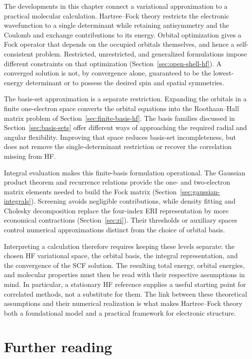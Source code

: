 \documentclass[11pt,a4paper,titlepage]{article}
\numberwithin{equation}{section}
\begin{document}
The developments in this chapter connect a variational approximation to a
practical molecular calculation. Hartree--Fock theory restricts the
electronic wavefunction to a single determinant while retaining
antisymmetry and the Coulomb and exchange contributions to its energy.
Orbital optimization gives a Fock operator that depends on the occupied
orbitals themselves, and hence a self-consistent problem. Restricted,
unrestricted, and generalized formulations impose different constraints on
that optimization (Section~\ref{sec:open-shell-hf}). A converged solution is
not, by convergence alone, guaranteed to be the lowest-energy determinant
or to possess the desired spin and spatial symmetries.

The basis-set approximation is a separate restriction. Expanding the
orbitals in a finite one-electron space converts the orbital equations into
the Roothaan--Hall matrix problem of Section~\ref{sec:finite-basis-hf}.
The basis families discussed in Section~\ref{sec:basis-sets} offer different
ways of approaching the required radial and angular flexibility. Improving
that space reduces basis-set incompleteness, but does not remove the
single-determinant restriction or recover the correlation missing from HF.

Integral evaluation makes this finite-basis formulation operational. The
Gaussian product theorem and recurrence relations provide the one- and
two-electron matrix elements needed to build the Fock matrix
(Section~\ref{sec:gaussian-integrals}). Screening avoids negligible
contributions, while density fitting and Cholesky decomposition replace the
four-index ERI representation by more economical contractions
(Section~\ref{sec:ri}). Their thresholds or auxiliary spaces control
numerical approximations distinct from the choice of orbital basis.

Interpreting a calculation therefore requires keeping these levels
separate: the chosen HF variational space, the orbital basis, the integral
representation, and the convergence of the SCF solution. The resulting
total energy, orbital energies, and molecular properties must then be read
with their respective assumptions in mind. In particular, a stationary HF
reference supplies a useful starting point for correlated methods, not a
substitute for them. The link between these theoretical assumptions and
their numerical realization is what makes Hartree--Fock theory both a
foundational model and a practical framework for electronic structure.

\section*{Further reading}
\end{document}
